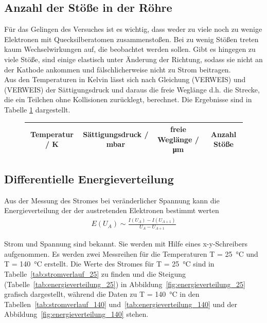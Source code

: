 \subsection{Anzahl der Stöße in der Röhre}
Für das Gelingen des Versuches ist es wichtig, dass weder zu viele noch zu wenige Elektronen mit Quecksilberatomen zusammenstoßen. Bei zu wenig Stößen treten kaum Wechselwirkungen auf, die beobachtet werden sollen. Gibt es hingegen zu viele Stöße, sind einige elastisch unter Änderung der Richtung, sodass sie nicht an der Kathode ankommen und fälschlicherweise nicht zu Strom beitragen. \\
Aus den Temperaturen in Kelvin lässt sich nach Gleichung (VERWEIS) und (VERWEIS) der Sättigungsdruck und daraus die freie Weglänge d.h. die Strecke, die ein Teilchen ohne Kollisionen zurücklegt, berechnet. Die Ergebnisse sind in Tabelle \ref{tab:temperaturen} dargestellt.


\begin{figure}[h!]
	\centering
	\begin{tabular}{cccc}
		Temperatur / \si{\kelvin} & Sättigungsdruck / \si{\milli\bar} & freie Weglänge / \si{\micro\meter} & Anzahl Stöße \\
		\hline
		
	\end{tabular}
	\label{tab:temperaturen}
\end{figure}




\subsection{Differentielle Energieverteilung}

Aus der Messung des Stromes bei veränderlicher Spannung kann die Energieverteilung der der austretenden Elektronen bestimmt werten
\begin{align}
	E(U_A) \sim \frac{I(U_A)-I(U_{A+1})}{U_A - U_{A+1}}
\end{align}

Strom und Spannung sind bekannt. Sie werden mit Hilfe eines x-y-Schreibers aufgenommen. Es werden zwei Messreihen für die Temperaturen T = \SI{25}{\celsius} und T = \SI{140}{\celsius} erstellt. Die Werte des Stromes für T = \SI{25}{\celsius} sind in Tabelle~\ref{tab:stromverlauf_25} zu finden und die Steigung  (Tabelle~\ref{tab:energieverteilung_25}) in Abbildung~\ref{fig:energieverteilung_25} grafisch dargestellt, während die Daten zu T = \SI{140}{\celsius} in den Tabellen~\ref{tab:stromverlauf_140} und~\ref{tab:energieverteilung_140} und der Abbildung~\ref{fig:energieverteilung_140}  stehen.




